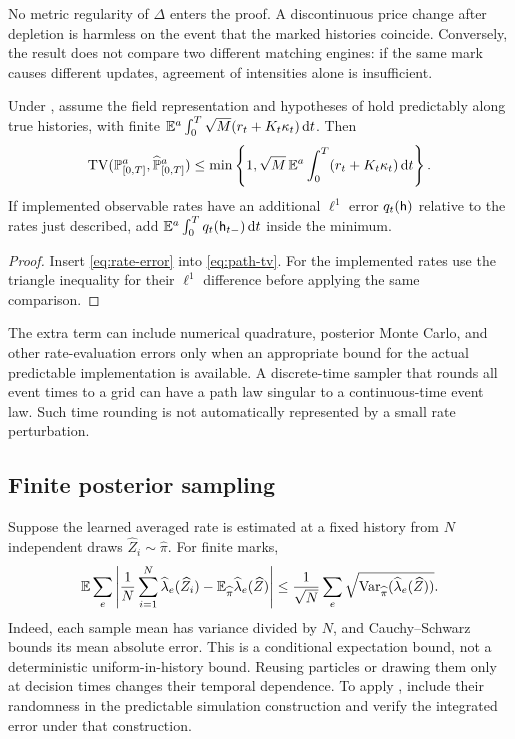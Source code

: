 No metric regularity of $\Delta$ enters the proof. A discontinuous price change after depletion is harmless on the event that the marked histories coincide. Conversely, the result does not compare two different matching engines: if the same mark causes different updates, agreement of intensities alone is insufficient.

\begin{theorem}\label{thm:main}
Under , assume the field representation and hypotheses of  hold predictably along true histories, with finite
$\mathbb E^a\int_0^T\sqrt M(r_t+K_t\kappa_t)\,\mathrm d t$. Then
\begin{equation}\label{eq:main}
 \operatorname{TV}(\mathbb P^a_{[0,T]},\widehat{\mathbb P}^a_{[0,T]})
 \le\min\left\{1,\sqrt M\,\mathbb E^a\int_0^T(r_t+K_t\kappa_t)\,\mathrm d t\right\}.
\end{equation}
If implemented observable rates have an additional $\ell^1$ error
$q_t(\mathsf h)$ relative to the rates just described, add
$\mathbb E^a\int_0^T q_t(\mathsf h_{t-})\,\mathrm d t$ inside the minimum.
\end{theorem}
\begin{proof}
Insert \eqref{eq:rate-error} into \eqref{eq:path-tv}. For the implemented rates use the triangle inequality for their $\ell^1$ difference before applying the same comparison.
\end{proof}

The extra term can include numerical quadrature, posterior Monte Carlo, and other rate-evaluation errors only when an appropriate bound for the actual predictable implementation is available. A discrete-time sampler that rounds all event times to a grid can have a path law singular to a continuous-time event law. Such time rounding is not automatically represented by a small rate perturbation.



\subsection{Finite posterior sampling}
Suppose the learned averaged rate is estimated at a fixed history from $N$ independent draws $\widehat Z_i\sim\widehat\pi$. For finite marks,
\begin{equation}\label{eq:mc-rates}
 \mathbb E\sum_e\left|
 \frac1N\sum_{i=1}^N\widehat\lambda_e(\widehat Z_i)
 -\mathbb E_{\widehat\pi}\widehat\lambda_e(\widehat Z)\right|
 \le \frac1{\sqrt N}\sum_e
 \sqrt{\operatorname{Var}_{\widehat\pi}(\widehat\lambda_e(\widehat Z))}.
\end{equation}
Indeed, each sample mean has variance divided by $N$, and Cauchy--Schwarz bounds its mean absolute error. This is a conditional expectation bound, not a deterministic uniform-in-history bound. Reusing particles or drawing them only at decision times changes their temporal dependence. To apply , include their randomness in the predictable simulation construction and verify the integrated error under that construction.

